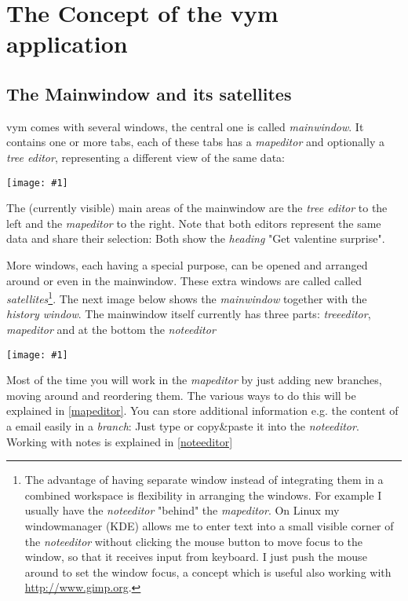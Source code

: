 \documentclass[12pt,a4paper]{article}
\newlength{\maximgwidth}
\newcommand{\maximage}[1]{  
    \begin{center}
        \texttt{[image: \#1]} 
    \end{center}
}
\newcommand{\vym}{{\sc vym }}
\begin{document}
\section{The Concept of the \vym application}
\subsection{The Mainwindow and its satellites} \label{satellite}
\vym comes with several windows, the central one is called {\em
mainwindow}. It contains one or more
tabs, each of these tabs has a {\em mapeditor} and optionally a {\em
tree editor}, representing a different view of the same data:
\maximage{images/mainwindow.png}
The (currently visible) main areas of the mainwindow are the {\em tree
editor} to the left and the {\em mapeditor} to the right. Note that both
editors represent the same data and share their selection: Both show the
{\em heading} "Get valentine surprise".

More windows, each having a special purpose, can be opened and arranged
around or even in the mainwindow. These extra windows are called
called {\em satellites}\footnote{
    The advantage of having separate window instead of integrating them
    in a combined workspace is flexibility in arranging the windows. For
    example I usually have the {\em noteeditor} "behind" the {\em
    mapeditor}. On Linux my windowmanager (KDE) allows me to enter text
    into a small visible corner of the {\em noteeditor} without clicking
    the mouse button to move focus to the window, so that it receives
    input from keyboard. I just push the mouse around to set the
    window focus, a concept which is useful also working with 
    \href{http://www.gimp.org}{http://www.gimp.org}.
}. 
The next image below shows the {\em mainwindow}
together with the {\em history window}. The mainwindow itself currently
has three parts: {\em treeeditor}, {\em mapeditor} and at the bottom
the {\em noteeditor}
\maximage{images/windows.png}
Most of the time you will work in the {\em mapeditor} by just adding new
branches, moving around and reordering them. The various ways to do this
will be explained in \ref{mapeditor}. You can store additional
information e.g. the content of a email easily in a {\em branch}: Just
type or copy\&paste it into the {\em noteeditor}. Working with notes is
explained in \ref{noteeditor}
\end{document}
